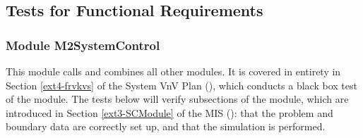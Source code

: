 \documentclass[12pt, titlepage]{article}
\begin{document}
\subsection{Tests for Functional Requirements}

\subsubsection{Module M2SystemControl}

This module calls and combines all other modules. It is covered in entirety in Section \ref{ext4-frvkvs} of the System VnV Plan (\citet{LBM_SVNV_PM}), which conducts a black box test of the module. The tests below will verify subsections of the module, which are introduced in Section \ref{ext3-SCModule} of the MIS (\citet{LBM_MIS_PM}): that the problem and boundary data are correctly set up, and that the simulation is performed.
\end{document}
